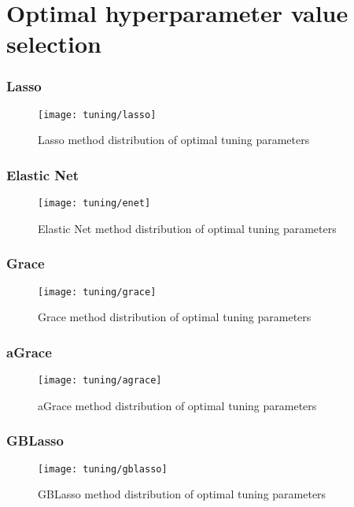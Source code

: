 \section{Optimal hyperparameter value selection}

\subsubsection{Lasso}
\begin{figure}[H]
	\centering
	\texttt{[image: tuning/lasso]}
	\caption{Lasso method distribution of optimal tuning parameters}
	\label{fig:tun_lasso}
\end{figure}

\subsubsection{Elastic Net}
\begin{figure}[H]
	\centering
	\texttt{[image: tuning/enet]}
	\caption{Elastic Net method distribution of optimal tuning parameters}
	\label{fig:tun_enet}
\end{figure}

\subsubsection{Grace}
\begin{figure}[H]
	\centering
	\texttt{[image: tuning/grace]}
	\caption{Grace method distribution of optimal tuning parameters}
	\label{fig:tun_grace}
\end{figure}

\subsubsection{aGrace}
\begin{figure}[H]
	\centering
	\texttt{[image: tuning/agrace]}
	\caption{aGrace method distribution of optimal tuning parameters}
	\label{fig:tun_agrace}
\end{figure}

\subsubsection{GBLasso}
\begin{figure}[H]
	\centering
	\texttt{[image: tuning/gblasso]}
	\caption{GBLasso method distribution of optimal tuning parameters}
	\label{fig:tun_gblasso}
\end{figure}

